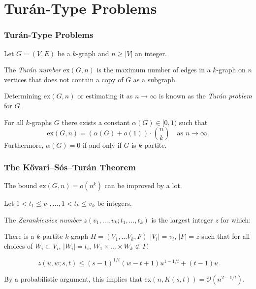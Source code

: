 \documentclass[aspectratio=169]{beamer}
\newcommand{\ex}[2]{\ensuremath{\text{ex} \left( #1, #2 \right)}}
\newcommand{\bigO}[1]{\ensuremath{\mathcal{O}\left(#1\right)}}
\theoremstyle{mystyle}
\begin{document}
\section{Turán-Type Problems}\label{sec:turan-type}

\begin{frame}
    \frametitle{Turán-Type Problems}
    \begin{definition}
        Let $G = (V, E)$ be a $k$-graph and $n \geq |V|$ an integer.

        The \emph{Turán number} $\ex{G}{n}$ is the maximum number of edges in a $k$-graph on $n$ vertices
        that does not contain a copy of $G$ as a subgraph.
    \end{definition}
    Determining $\ex{G}{n}$ or estimating it as $n \to \infty$ is known as the \emph{Turán problem} for $G$.
    \begin{theorem}
        For all $k$-graphs $G$ there exists a constant $\alpha (G) \in [0, 1)$ such that
        \[
            \ex{G}{n} = (\alpha (G) + o(1)) \cdot \binom{n}{k} \quad \text{as } n \to \infty.
        \]
        Furthermore, $\alpha (G) = 0$ if and only if $G$ is $k$-partite.
    \end{theorem}
\end{frame}

\begin{frame}
    \frametitle{The Kővari--Sós--Turán Theorem}
    The bound $\ex{G}{n} = o(n^k)$ can be improved by a lot.
    \begin{definition}
     Let $1 < t_1 \leq v_1, \dots, 1 < t_k \leq v_k$ be integers.

    The \emph{Zarankiewicz number} $z(v_1, \dots, v_k; t_1, \dots, t_k)$
    is the largest integer $z$ for which:

    There is a $k$-partite $k$-graph
    $H = (V_1, \dots V_k, F)$ $ |V_i| = v_i$, $|F| = z$
    such that for all choices of $W_i \subset V_i$, $|W_i| = t_i$,
    $W_1 \times \dots \times W_k \not \subset F$.
    \end{definition}
    \begin{theorem}
        \[z(u, w; s, t) \leq (s - 1)^{1 / t}(w - t + 1)u^{1 - 1 / t} + (t - 1)u\]
    \end{theorem}
    By a probabilistic argument, this implies that
    $\ex{n}{K(s, t)} = \bigO{n^{2 - 1 / t}}$.
\end{frame}
\end{document}
